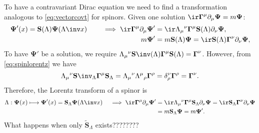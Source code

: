 \documentclass[11pt]{article}
\newcommand{\Gammab}{\boldsymbol{\Gamma}}
\renewcommand{\S}{\mathbf{S}}
\newcommand{\St}{\widetilde{\S}}
\newcommand{\Psib}{\boldsymbol{\Psi}}
\begin{document}
To have a contravariant Dirac equation we need to find a transformation analogous to \cref{eq:vectorcovt} for spinors.
Given one solution \(\ir \Gammab^\mu \partial_\mu \Psib = m \Psib\):
%
\begin{equation*}
\begin{aligned}
  \Psib'(x) = \S(\Lambda) \Psib(\Lambda\inv x)
  \qquad\implies
  \ir \Gammab^\mu \partial_\mu \Psib'
    &= \ir \Lambda_\mu{}^\nu \Gammab^\mu \S(\Lambda) \partial_\nu \Psib, \\
  m \Psib' &= m \S(\Lambda) \Psib
    = \ir \S(\Lambda) \Gammab^\nu \partial_\nu \Psib,
\end{aligned}
\end{equation*}
%
To have \(\Psib'\) be a solution, we require \(\Lambda_\mu{}^\nu \S\inv(\Lambda) \Gammab^\mu \S(\Lambda) = \Gammab^\nu\).
However, from \cref{eq:spinlorentz} we have
%
\begin{equation*}
  \Lambda_\mu{}^\nu \S\inv_\Lambda \Gammab^\mu \S_\Lambda 
    = \Lambda_\mu{}^\nu \Lambda^\mu{}_\rho \Gammab^\rho
    = \delta^\nu_\rho \Gammab^\rho 
    = \Gammab^\nu.
\end{equation*}
%
Therefore, the Lorentz transform of a spinor is
%
\begin{equation}\label{eq:diraccovt}
\begin{aligned}
  \Lambda: \Psib(x) \longmapsto \Psib'(x) = \S_\Lambda \Psib(\Lambda\inv x)
  \quad \implies
  \ir \Gammab^\mu \partial_\mu \Psib'
    &= \ir \Lambda_\mu{}^\nu \Gammab^\mu \S_\Lambda \partial_\nu \Psib
    = \ir \S_\Lambda \Gammab^\nu \partial_\nu \Psib \\
    &= m \S_\Lambda \Psib
    = m \Psib'.
\end{aligned}
\end{equation}
%
What happens when only \(\St_\Lambda\) exists????????
\end{document}
